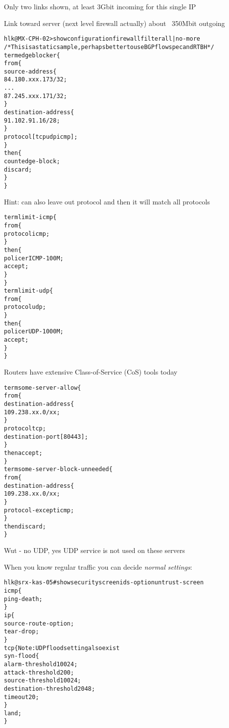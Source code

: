 \documentclass[Screen16to9,17pt]{foils}
\begin{document}

\centerline{Only two links shown, at least 3Gbit incoming for this single IP}

\centerline{Link toward server (next level firewall actually) about ~350Mbit outgoing}



\begin{alltt}\footnotesize
hlk@MX-CPH-02> show configuration firewall filter all | no-more
/* This is a static sample, perhaps better to use BGP flowspec and RTBH */
term edgeblocker \{
    from \{
        source-address \{
            84.180.xxx.173/32;
...
            87.245.xxx.171/32;
        \}
        destination-address \{
            91.102.91.16/28;
        \}
        protocol [ tcp udp icmp ];
    \}
    then \{
        count edge-block;
        discard;
    \}
\}
\end{alltt}
Hint: can also leave out protocol and then it will match all protocols


\begin{alltt}\footnotesize
term limit-icmp \{
    from \{
        protocol icmp;
    \}
    then \{
        policer ICMP-100M;
        accept;
    \}
\}
term limit-udp \{
    from \{
        protocol udp;
    \}
    then \{
        policer UDP-1000M;
        accept;
    \}
\}
\end{alltt}

Routers have extensive Class-of-Service (CoS) tools today


\begin{alltt}\footnotesize
term some-server-allow \{
    from \{
        destination-address \{
            109.238.xx.0/xx;
        \}
        protocol tcp;
        destination-port [ 80 443 ];
    \}
    then accept;
\}
term some-server-block-unneeded \{
    from \{
        destination-address \{
            109.238.xx.0/xx;
        \}
        protocol-except icmp;
    \}
    then discard;
\}
\end{alltt}

Wut - no UDP, yes UDP service is not used on these servers



When you know regular traffic you can decide \emph{normal settings}:

\begin{alltt}\footnotesize
hlk@srx-kas-05# show security screen ids-option untrust-screen
icmp \{
    ping-death;
\}
ip \{
    source-route-option;
    tear-drop;
\}
tcp \{    Note: UDP flood setting also exist
    syn-flood \{
        alarm-threshold 10024;
        attack-threshold 200;
        source-threshold 10024;
        destination-threshold 2048;
        timeout 20;
    \}
    land;
\}
\end{alltt}




\slidenext{}
\end{document}
